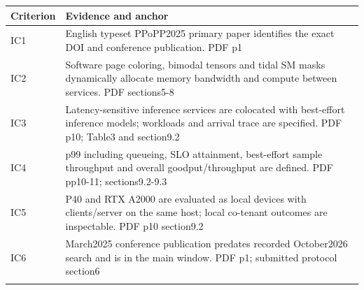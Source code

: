 \begin{longtable}{>{\raggedright\arraybackslash}p{}>{\raggedright\arraybackslash}p{}}
\toprule
\textbf{Criterion} & \textbf{Evidence and anchor}\\\midrule\endhead
IC1 & English typeset PPoPP2025 primary paper identifies the exact DOI and conference publication. PDF p1\\\addlinespace
IC2 & Software page coloring,\allowbreak{} bimodal tensors and tidal SM masks dynamically allocate memory bandwidth and compute between services. PDF sections5-8\\\addlinespace
IC3 & Latency-sensitive inference services are colocated with best-effort inference models;\allowbreak{} workloads and arrival trace are specified. PDF p10;\allowbreak{} Table3 and section9.2\\\addlinespace
IC4 & p99 including queueing,\allowbreak{} SLO attainment,\allowbreak{} best-effort sample throughput and overall goodput/throughput are defined. PDF pp10-11;\allowbreak{} sections9.2-9.3\\\addlinespace
IC5 & P40 and RTX A2000 are evaluated as local devices with clients/server on the same host;\allowbreak{} local co-tenant outcomes are inspectable. PDF p10 section9.2\\\addlinespace
IC6 & March2025 conference publication predates recorded October2026 search and is in the main window. PDF p1;\allowbreak{} submitted protocol section6\\\addlinespace
\bottomrule\end{longtable}

